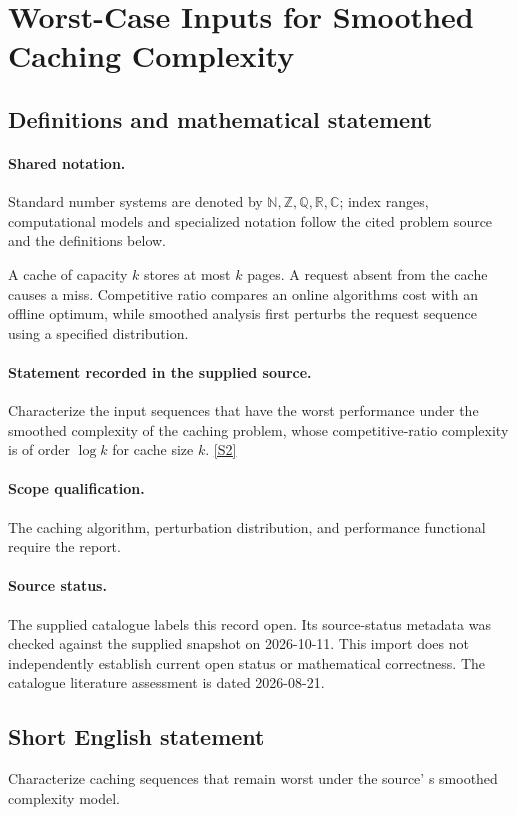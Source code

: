 \documentclass[11pt]{article}
\newcommand{\sref}[2]{\hyperlink{source:#1:#2}{[S#2]}}
\begin{document}
\section{Worst-Case Inputs for Smoothed Caching Complexity}\label{statement}

\subsection{Definitions and mathematical statement}

\paragraph{Shared notation.}Standard number systems are denoted by $\mathbb N,\mathbb Z,\mathbb Q,\mathbb R,\mathbb C$; index ranges, computational models and specialized notation follow the cited problem source and the definitions below.


A cache of capacity $k$ stores at most $k$ pages. A request absent from the cache causes a miss. Competitive ratio compares an online algorithm\textquotesingle s cost with an offline optimum, while smoothed analysis first perturbs the request sequence using a specified distribution.
\paragraph{Statement recorded in the supplied source.}
Characterize the input sequences that have the worst performance under the smoothed complexity of the caching problem, whose competitive-ratio complexity is of order $\log k$ for cache size $k$. \sref{statement}{2}
\paragraph{Scope qualification.}
The caching algorithm, perturbation distribution, and performance functional require the report.
\paragraph{Source status.}
The supplied catalogue labels this record open. Its source-status metadata was checked against the supplied snapshot on 2026-10-11. This import does not independently establish current open status or mathematical correctness. The catalogue literature assessment is dated 2026-08-21.
\subsection{Short English statement}
Characterize caching sequences that remain worst under the source' s smoothed complexity model.
\end{document}
